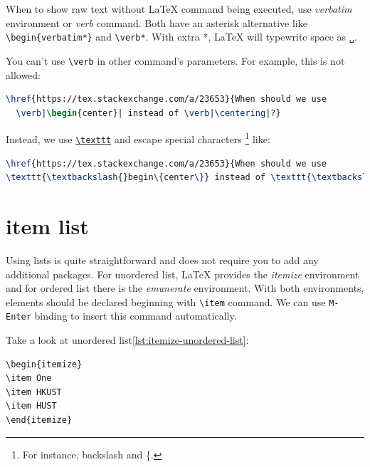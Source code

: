 When to show raw text without \LaTeX{} command being executed, use
\textit{verbatim} environment or \textit{verb} command. Both have
an asterisk alternative like \verb|\begin{verbatim*}| and
  \verb|\verb*|. With extra *, \LaTeX{} will typewrite space as
\texttt{␣}.

You can't use \texttt{\textbackslash{}verb} in other command's
parameters. For example, this is not allowed:

\begin{lstlisting}[language=TeX,caption={Illegal verb}]
\href{https://tex.stackexchange.com/a/23653}{When should we use
  \verb|\begin{center}| instead of \verb|\centering|?}
\end{lstlisting}

Instead, we use
\href{https://tex.stackexchange.com/q/2790}{\texttt{\textbackslash{}texttt}}
and escape special characters \footnote{For instance, backslash
and \{.} like:

\begin{lstlisting}[language=TeX,caption={texttt}]
\href{https://tex.stackexchange.com/a/23653}{When should we use
\texttt{\textbackslash{}begin\{center\}} instead of \texttt{\textbackslash{}centering}?}
\end{lstlisting}

\section{item list}
\label{sec:item-list}

Using lists is quite straightforward and does not require you to
add any additional packages. For unordered list, \LaTeX{} provides
the \textit{itemize} environment and for ordered list there is the
\textit{emunerate} environment. With both environments, elements
should be declared beginning with \verb|\item| command. We can use
\verb|M-Enter| binding to insert this command automatically.

Take a look at unordered list\ref{lst:itemize-unordered-list}:

\begin{minipage}{.4\linewidth}
\begin{lstlisting}[label={lst:itemize-unordered-list},linewidth=.7\textwidth]
\begin{itemize}
\item One
\item HKUST
\item HUST
\end{itemize}
\end{lstlisting}  
\end{minipage}
\hfill
{}

